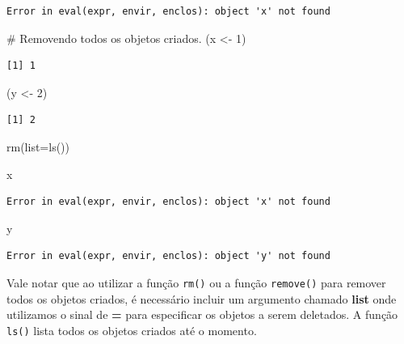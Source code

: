 \documentclass[
  letterpaper,
  DIV=11,
  numbers=noendperiod]{scrreprt}
\newenvironment{Shaded}{\begin{snugshade}}{\end{snugshade}}
\newcommand{\AttributeTok}[1]{\textcolor[rgb]{0.40,0.45,0.13}{#1}}
\newcommand{\CommentTok}[1]{\textcolor[rgb]{0.37,0.37,0.37}{#1}}
\newcommand{\DecValTok}[1]{\textcolor[rgb]{0.68,0.00,0.00}{#1}}
\newcommand{\FunctionTok}[1]{\textcolor[rgb]{0.28,0.35,0.67}{#1}}
\newcommand{\NormalTok}[1]{\textcolor[rgb]{0.00,0.23,0.31}{#1}}
\newcommand{\OtherTok}[1]{\textcolor[rgb]{0.00,0.23,0.31}{#1}}
\begin{document}
\begin{verbatim}
Error in eval(expr, envir, enclos): object 'x' not found
\end{verbatim}

\begin{Shaded}
\begin{Highlighting}[]
\CommentTok{\# Removendo todos os objetos criados.}
\NormalTok{(x }\OtherTok{\textless{}{-}} \DecValTok{1}\NormalTok{)}
\end{Highlighting}
\end{Shaded}

\begin{verbatim}
[1] 1
\end{verbatim}

\begin{Shaded}
\begin{Highlighting}[]
\NormalTok{(y }\OtherTok{\textless{}{-}} \DecValTok{2}\NormalTok{)}
\end{Highlighting}
\end{Shaded}

\begin{verbatim}
[1] 2
\end{verbatim}

\begin{Shaded}
\begin{Highlighting}[]
\FunctionTok{rm}\NormalTok{(}\AttributeTok{list=}\FunctionTok{ls}\NormalTok{())}

\NormalTok{x}
\end{Highlighting}
\end{Shaded}

\begin{verbatim}
Error in eval(expr, envir, enclos): object 'x' not found
\end{verbatim}

\begin{Shaded}
\begin{Highlighting}[]
\NormalTok{y}
\end{Highlighting}
\end{Shaded}

\begin{verbatim}
Error in eval(expr, envir, enclos): object 'y' not found
\end{verbatim}

Vale notar que ao utilizar a função \texttt{rm()} ou a função
\texttt{remove()} para remover todos os objetos criados, é necessário
incluir um argumento chamado \textbf{list} onde utilizamos o sinal de
\textbf{=} para especificar os objetos a serem deletados. A função
\texttt{ls()} lista todos os objetos criados até o momento.
\end{document}
